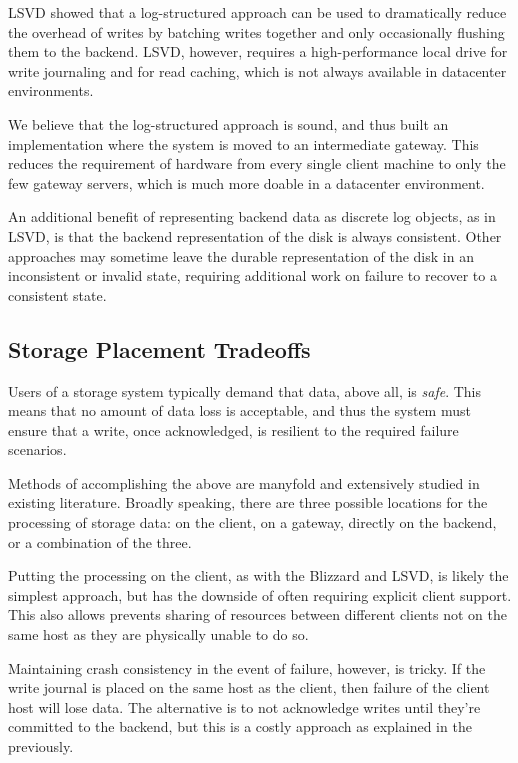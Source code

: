 LSVD showed that a log-structured approach can be used to dramatically reduce
the overhead of writes by batching writes together and only occasionally
flushing them to the backend. LSVD, however, requires a high-performance local
drive for write journaling and for read caching, which is not always available
in datacenter environments.

We believe that the log-structured approach is sound, and thus built an
implementation where the system is moved to an intermediate gateway. This
reduces the requirement of hardware from every single client machine to only the
few gateway servers, which is much more doable in a datacenter environment.

An additional benefit of representing backend data as discrete log objects, as
in LSVD, is that the backend representation of the disk is always consistent.
Other approaches may sometime leave the durable representation of the disk in an
inconsistent or invalid state, requiring additional work on failure to recover
to a consistent state.

\subsection{Storage Placement Tradeoffs}

Users of a storage system typically demand that data, above all, is
\textit{safe}. This means that no amount of data loss is acceptable, and thus
the system must ensure that a write, once acknowledged, is resilient to the
required failure scenarios.

Methods of accomplishing the above are manyfold and extensively studied in
existing literature. Broadly speaking, there are three possible locations for
the processing of storage data: on the client, on a gateway, directly on the
backend, or a combination of the three.

Putting the processing on the client, as with the Blizzard and LSVD, is likely
the simplest approach, but has the downside of often requiring explicit client
support. This also allows prevents sharing of resources between different
clients not on the same host as they are physically unable to do so.

Maintaining crash consistency in the event of failure, however, is tricky. If
the write journal is placed on the same host as the client, then failure of the
client host will lose data. The alternative is to not acknowledge writes until
they're committed to the backend, but this is a costly approach as explained in
the previously.


